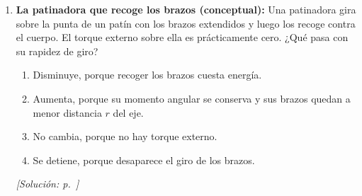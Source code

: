 \begin{enumerate}[label=\textbf{P\arabic*.}, ref=P\arabic*, leftmargin=*]
    \item\label{prob:parcial2-patinadora} \textbf{La patinadora que recoge
    los brazos (conceptual):} Una patinadora gira sobre la punta de un patín
    con los brazos extendidos y luego los recoge contra el cuerpo. El torque
    externo sobre ella es prácticamente cero. ¿Qué pasa con su rapidez de
    giro?
    \begin{enumerate}[label=\alph*)]
        \item Disminuye, porque recoger los brazos cuesta energía.
        \item Aumenta, porque su momento angular se conserva y sus brazos
        quedan a menor distancia $r$ del eje.
        \item No cambia, porque no hay torque externo.
        \item Se detiene, porque desaparece el giro de los brazos.
    \end{enumerate}
    \hfill\textit{[Solución: p.~\pageref{sol:parcial2-patinadora}]}

\end{enumerate}
